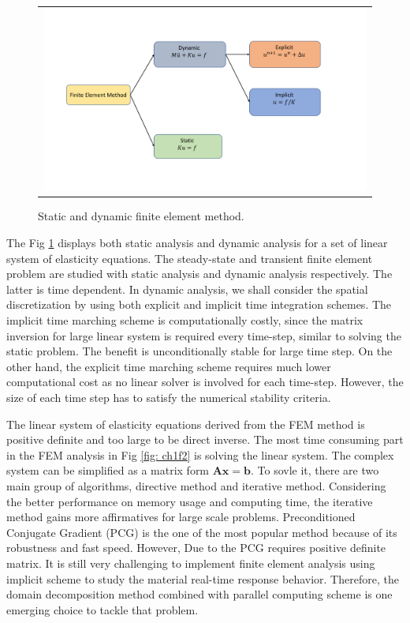\begin{figure}[H]
	\centering
	\begin{tabular}{c}
		\includegraphics[width=1.0\textwidth]{./pics/fem}
	\end{tabular}
	\caption{\footnotesize Static and dynamic finite element method.} \label{fig: ch1f3}
\end{figure}

The Fig \ref{fig: ch1f3} displays both static analysis and dynamic analysis for a set of linear system of elasticity equations. The steady-state and transient finite element problem are studied with static analysis and dynamic analysis respectively. The latter is time dependent. In dynamic analysis, we shall consider the spatial discretization by using both explicit and implicit time integration schemes\cite{bathe2008finite}. The implicit time marching scheme is computationally costly, since the matrix inversion for large linear system is required every time-step, similar to solving the static problem. The benefit is unconditionally stable for large time step. On the other hand, the explicit time marching scheme requires much lower computational cost as no linear solver is involved for each time-step. However, the size of each time step has to satisfy the numerical stability criteria. 


The linear system of elasticity equations derived from the FEM method is positive definite and too large to be direct inverse. The most time consuming part in the FEM analysis in Fig \ref{fig: ch1f2} is solving the linear system. The complex system can be simplified as a matrix form $ \mathbf{A} \mathbf{x} = \mathbf{b} $. To sovle it, there are two main group of algorithms, directive method and iterative method. Considering the better performance on memory usage and computing time, the iterative method gains more affirmatives\cite{brussino1989comparison} for large scale problems. Preconditioned Conjugate Gradient (PCG) is the one of the most popular method because of its robustness and fast speed. However, Due to the PCG requires positive definite matrix. It is still very challenging to implement finite element analysis using implicit scheme to study the material real-time response behavior. Therefore, the domain decomposition method combined with parallel computing scheme is one emerging choice to tackle that problem.


